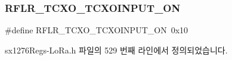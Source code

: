 \subsubsection{\texorpdfstring{R\+F\+L\+R\+\_\+\+T\+C\+X\+O\+\_\+\+T\+C\+X\+O\+I\+N\+P\+U\+T\+\_\+\+ON}{RFLR\_TCXO\_TCXOINPUT\_ON}}
{\footnotesize\ttfamily \#define R\+F\+L\+R\+\_\+\+T\+C\+X\+O\+\_\+\+T\+C\+X\+O\+I\+N\+P\+U\+T\+\_\+\+ON~0x10}



sx1276\+Regs-\/\+Lo\+Ra.\+h 파일의 529 번째 라인에서 정의되었습니다.

